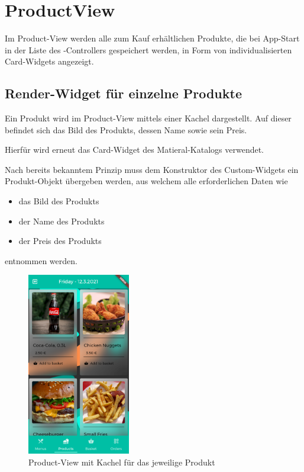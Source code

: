 \section{ProductView}
\label{productview}

Im Product-View werden alle zum Kauf erhältlichen Produkte, die bei App-Start in der Liste des
-Controllers gespeichert werden, in Form von individualisierten Card-Widgets angezeigt.

\subsection{Render-Widget für einzelne Produkte}

Ein Produkt wird im Product-View mittels einer Kachel dargestellt. Auf dieser befindet sich 
das Bild des Produkts, dessen Name sowie sein Preis.

Hierfür wird erneut das Card-Widget des Matieral-Katalogs verwendet.

Nach bereits bekanntem Prinzip muss dem Konstruktor des Custom-Widgets ein Produkt-Objekt
übergeben werden, aus welchem alle erforderlichen Daten wie

\begin{itemize}
    \item das Bild des Produkts
    \item der Name des Produkts
    \item der Preis des Produkts
\end{itemize}

entnommen werden.

\begin{figure}[H]
    \centering
    \includegraphics[width=0.40\textwidth]{images/Client/views/productview/productview.png}
    \caption{Product-View mit Kachel für das jeweilige Produkt}
\end{figure}

